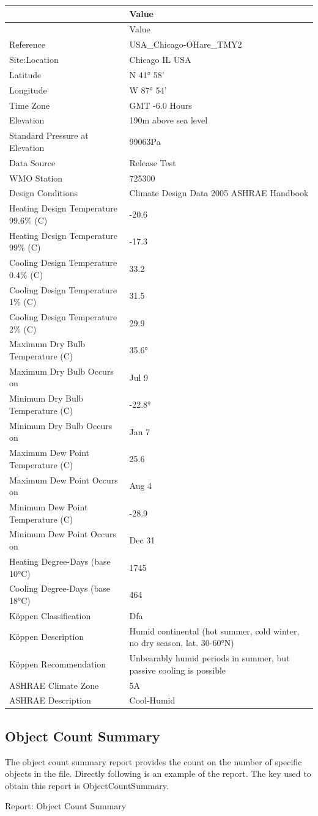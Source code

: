 \begin{longtable}[c]{>{\raggedright}p{2.02in}>{\raggedright}p{3.96in}}
\toprule
~ & Value \tabularnewline
\midrule
\endfirsthead

\toprule
~ & Value \tabularnewline
\midrule
\endhead

Reference & USA\_Chicago-OHare\_TMY2 \tabularnewline
Site:Location & Chicago IL USA \tabularnewline
Latitude & N 41° 58' \tabularnewline
Longitude & W 87° 54' \tabularnewline
Time Zone & GMT -6.0 Hours \tabularnewline
Elevation & 190m above sea level \tabularnewline
Standard Pressure at Elevation & 99063Pa \tabularnewline
Data Source & Release Test \tabularnewline
WMO Station & 725300 \tabularnewline
Design Conditions & Climate Design Data 2005 ASHRAE Handbook \tabularnewline
Heating Design Temperature 99.6\% (C) & -20.6 \tabularnewline
Heating Design Temperature 99\% (C) & -17.3 \tabularnewline
Cooling Design Temperature 0.4\% (C) & 33.2 \tabularnewline
Cooling Design Temperature 1\% (C) & 31.5 \tabularnewline
Cooling Design Temperature 2\% (C) & 29.9 \tabularnewline
Maximum Dry Bulb Temperature (C) & 35.6° \tabularnewline
Maximum Dry Bulb Occurs on & Jul 9 \tabularnewline
Minimum Dry Bulb Temperature (C) & -22.8° \tabularnewline
Minimum Dry Bulb Occurs on & Jan 7 \tabularnewline
Maximum Dew Point Temperature (C) & 25.6 \tabularnewline
Maximum Dew Point Occurs on & Aug 4 \tabularnewline
Minimum Dew Point Temperature (C) & -28.9 \tabularnewline
Minimum Dew Point Occurs on & Dec 31 \tabularnewline
Heating Degree-Days (base 10°C) & 1745 \tabularnewline
Cooling Degree-Days (base 18°C) & 464 \tabularnewline
Köppen Classification & Dfa \tabularnewline
Köppen Description & Humid continental (hot summer, cold winter, no dry season, lat. 30-60°N) \tabularnewline
Köppen Recommendation & Unbearably humid periods in summer, but passive cooling is possible \tabularnewline
ASHRAE Climate Zone & 5A \tabularnewline
ASHRAE Description & Cool-Humid \tabularnewline
\bottomrule
\end{longtable}

\subsection{Object Count Summary}\label{object-count-summary}

The object count summary report provides the count on the number of specific objects in the file. Directly following is an example of the report. The key used to obtain this report is ObjectCountSummary.

Report: Object Count Summary

